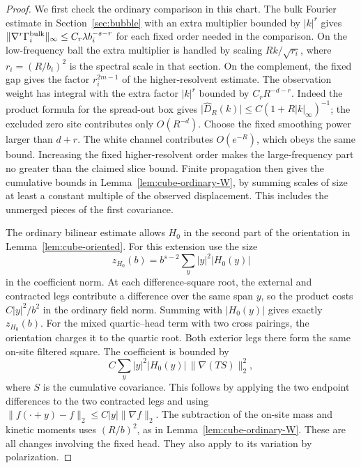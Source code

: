 \documentclass[11pt]{article}
\theoremstyle{definition}
\begin{document}
\begin{proof}
We first check the ordinary comparison in this chart. The bulk
Fourier estimate in Section~\ref{sec:bubble} with an extra multiplier
bounded by \(|k|^r\) gives
\(\|\nabla^r\Gamma_i^{\rm bulk}\|_\infty
 \le C_r\lambda b_i^{-s-r}\) for each fixed order needed in the
comparison. On the low-frequency ball the extra multiplier is
handled by scaling \(Rk/\sqrt{r_i}\), where
\(r_i=(R/b_i)^2\) is the spectral scale in that section. On the
complement, the fixed gap gives the factor \(r_i^{2m-1}\) of the
higher-resolvent estimate. The observation weight has integral
with the extra factor \(|k|^r\) bounded by \(C_r R^{-d-r}\).
Indeed the product formula for the spread-out box gives
\(\lvert\widehat D_R(k)\rvert\le C(1+R|k|_\infty)^{-1}\);
the excluded zero site contributes only \(O(R^{-d})\).
Choose the fixed smoothing power larger than \(d+r\).
The white channel contributes \(O(e^{-R})\), which obeys the
same bound. Increasing the fixed higher-resolvent order makes
the large-frequency part no greater than the claimed slice bound.
Finite propagation then gives the cumulative bounds in
Lemma~\ref{lem:cube-ordinary-W}, by summing scales of size at least
a constant multiple of the observed displacement. This includes the
unmerged pieces of the first covariance.

The ordinary bilinear estimate allows \(H_0\) in the second part
of the orientation in Lemma~\ref{lem:cube-oriented}. For this
extension use the size
\begin{equation}
 z_{H_0}(b)=b^{s-2}\sum_y |y|^2|H_0(y)|
\end{equation}
in the coefficient norm. At each difference-square root, the
external and contracted legs contribute a difference over the same
span \(y\), so the product costs \(C|y|^2/b^2\) in the ordinary
field norm. Summing with \(|H_0(y)|\) gives exactly \(z_{H_0}(b)\).
For the mixed quartic--head term with two cross pairings, the
orientation charges it to the quartic root. Both exterior legs
there form the same on-site filtered square. The coefficient is
bounded by
\begin{equation}
 C \sum_y |y|^2 |H_0(y)|\,\|\nabla(TS)\|_2^2 ,
\end{equation}
where \(S\) is the cumulative covariance. This follows by applying
the two endpoint differences to the two contracted legs and using
\(\|f(\cdot+y)-f\|_2\le C |y|\|\nabla f\|_2\).
The subtraction of the on-site mass and kinetic moments uses
\((R/b)^2\), as in Lemma~\ref{lem:cube-ordinary-W}.
These are all changes involving the fixed head. They also apply to
its variation by polarization.


\end{proof}
\end{document}
